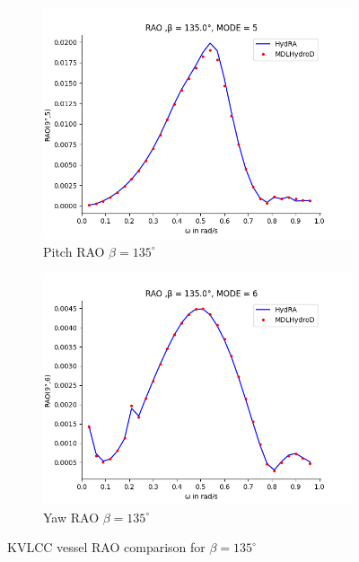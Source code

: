 \begin{figure}[H]
\begin{subfigure}[b]{0.45\textwidth}
        \includegraphics[width=\textwidth]{plots/kcs/rao2/rao5.png}
        \caption{Pitch RAO $\beta = 135^{\circ}$}
    \end{subfigure}
    \begin{subfigure}[b]{0.45\textwidth}
        \includegraphics[width=\textwidth]{plots/kcs/rao2/rao6.png}
        \caption{Yaw RAO $\beta = 135^{\circ}$}
    \end{subfigure}
    \caption{KVLCC vessel RAO comparison for $\beta= 135^{\circ}$}
    \label{fig:kvlcc_rao_135}
\end{figure}

\newpage
